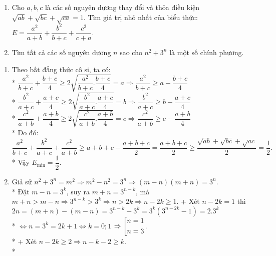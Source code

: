 \begin{ex}%
 \hfill
    \begin{enumerate}
    \item Cho $a,b,c$ là các số nguyên dương thay đổi và thỏa điều kiện $\sqrt{ab}+\sqrt{bc}+\sqrt{ca}=1$. Tìm giá trị nhỏ nhất của biểu thức: $E = \dfrac{{{a^2}}}{{a + b}} + \dfrac{{{b^2}}}{{b + c}} + \dfrac{{{c^2}}}{{c + a}}.$
    \item Tìm tất cả các số nguyên dương $n$ sao cho $n^{2}+3^{n}$ là một số chính phương.
    \end{enumerate}
\loigiai
    {
    \begin{enumerate}
    \item Theo bất đẳng thức cô si, ta có:\\*
    $\dfrac{{{a^2}}}{{b + c}} + \dfrac{{b + c}}{4} \ge 2\sqrt {\dfrac{{{a^2}}}{{b + c}}.\dfrac{{b + c}}{4}}  = a \Rightarrow \dfrac{{{a^2}}}{{b + c}} \ge a - \dfrac{{b + c}}{4}$\\*
    $\dfrac{{{b^2}}}{{a + c}} + \dfrac{{a + c}}{4} \ge 2\sqrt {\dfrac{{{b^2}}}{{a + c}}.\dfrac{{a + c}}{4}}=b \Rightarrow \dfrac{{{b^2}}}{{a + c}} \ge b - \dfrac{{a + c}}{4}$\\*
    $\dfrac{{{c^2}}}{{a + b}} + \dfrac{{a + b}}{4} \ge 2\sqrt {\dfrac{{{c^2}}}{{a + b}}.\dfrac{{a + b}}{4}}=c \Rightarrow \dfrac{{{c^2}}}{{a + b}} \ge c - \dfrac{{a + b}}{4}$\\*
    Do đó: $\dfrac{{{a^2}}}{{b + c}} + \dfrac{{{b^2}}}{{a + c}} + \dfrac{{{c^2}}}{{a + b}} \ge a + b + c - \dfrac{{a + b + c}}{2} = \dfrac{{a + b + c}}{2} \ge \dfrac{{\sqrt {ab}  + \sqrt {bc}  + \sqrt {ac} }}{2} = \dfrac{1}{2}.$\\*
    Vậy  ${E_{\min }} = \dfrac{1}{2}.$
    \item Giả sử ${n^2} + {3^n} = {m^2} \Rightarrow {m^2} - {n^2} = {3^n} \Rightarrow \left( {m - n} \right)\left( {m + n} \right) = {3^n}.$\\*
        Đặt $m - n = {3^k}$, suy ra $m + n = {3^{n - k}}$, mà $m + n > m - n \Rightarrow 3^{n-k}>3^{k} \Rightarrow n>2k \Rightarrow n-2k \geq 1$.
        + Xét $n-2k=1$ thì $2n = \left( {m + n} \right) - \left( {m - n} \right) = {3^{n - k}} - {3^k} = {3^k}\left( {{3^{n - 2k}} - 1} \right) = {2.3^k}$ \\*
        $\Leftrightarrow n = {3^k} = 2k + 1 \Leftrightarrow k = 0;1$ $\Rightarrow \left[\begin{aligned}&n=1\\ &n=3\end{aligned}\right.$.\\*
        + Xét $n-2k\geq 2 \Rightarrow n - k - 2 \ge k$. \\*

\end{enumerate}}
\end{ex}
